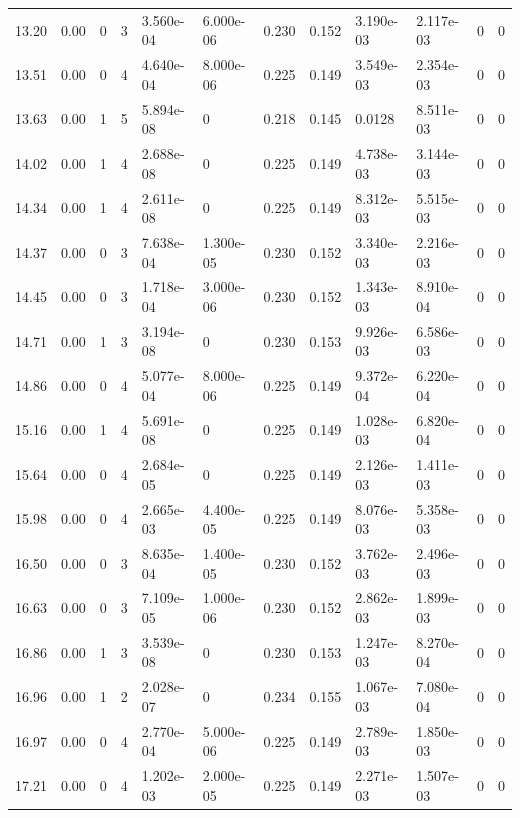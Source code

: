 \documentclass[preview]{standalone}
\begin{document}
{{{\begin{tabular}{L{1.2cm}C{1.2cm} C{0.3cm}C{0.5cm} C{1.4cm}C{1.4cm} C{1.4cm}C{1.4cm} C{1.6cm}C{1.6cm} C{1.6cm}C{1.6cm}}
  13.20  &  0.00  & 0     &  3 &  3.560e-04  & 6.000e-06  &  0.230&   0.152& 3.190e-03 & 2.117e-03   &  0 & 0  \\ 
  13.51  &  0.00  & 0     &  4 &  4.640e-04  & 8.000e-06  &  0.225&   0.149& 3.549e-03 & 2.354e-03   &  0 & 0  \\ 
  13.63  &  0.00  & 1     &  5 &  5.894e-08  & 0  &  0.218&   0.145& 0.0128 & 8.511e-03   &  0 & 0  \\ 
  14.02  &  0.00  & 1     &  4 &  2.688e-08  & 0  &  0.225&   0.149& 4.738e-03 & 3.144e-03   &  0 & 0  \\ 
  14.34  &  0.00  & 1     &  4 &  2.611e-08  & 0  &  0.225&   0.149& 8.312e-03 & 5.515e-03   &  0 & 0  \\ 
  14.37  &  0.00  & 0     &  3 &  7.638e-04  & 1.300e-05  &  0.230&   0.152& 3.340e-03 & 2.216e-03   &  0 & 0  \\ 
  14.45  &  0.00  & 0     &  3 &  1.718e-04  & 3.000e-06  &  0.230&   0.152& 1.343e-03 & 8.910e-04   &  0 & 0  \\ 
  14.71  &  0.00  & 1     &  3 &  3.194e-08  & 0  &  0.230&   0.153& 9.926e-03 & 6.586e-03   &  0 & 0  \\ 
  14.86  &  0.00  & 0     &  4 &  5.077e-04  & 8.000e-06  &  0.225&   0.149& 9.372e-04 & 6.220e-04   &  0 & 0  \\ 
  15.16  &  0.00  & 1     &  4 &  5.691e-08  & 0  &  0.225&   0.149& 1.028e-03 & 6.820e-04   &  0 & 0  \\ 
  15.64  &  0.00  & 0     &  4 &  2.684e-05  & 0  &  0.225&   0.149& 2.126e-03 & 1.411e-03   &  0 & 0  \\ 
  15.98  &  0.00  & 0     &  4 &  2.665e-03  & 4.400e-05  &  0.225&   0.149& 8.076e-03 & 5.358e-03   &  0 & 0  \\ 
  16.50  &  0.00  & 0     &  3 &  8.635e-04  & 1.400e-05  &  0.230&   0.152& 3.762e-03 & 2.496e-03   &  0 & 0  \\ 
  16.63  &  0.00  & 0     &  3 &  7.109e-05  & 1.000e-06  &  0.230&   0.152& 2.862e-03 & 1.899e-03   &  0 & 0  \\ 
  16.86  &  0.00  & 1     &  3 &  3.539e-08  & 0  &  0.230&   0.153& 1.247e-03 & 8.270e-04   &  0 & 0  \\ 
  16.96  &  0.00  & 1     &  2 &  2.028e-07  & 0  &  0.234&   0.155& 1.067e-03 & 7.080e-04   &  0 & 0  \\ 
  16.97  &  0.00  & 0     &  4 &  2.770e-04  & 5.000e-06  &  0.225&   0.149& 2.789e-03 & 1.850e-03   &  0 & 0  \\ 
  17.21  &  0.00  & 0     &  4 &  1.202e-03  & 2.000e-05  &  0.225&   0.149& 2.271e-03 & 1.507e-03   &  0 & 0  \\ 

\end{tabular}}}}
\end{document}
